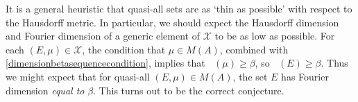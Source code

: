 \documentclass[12pt,reqno]{article}
\DeclareMathOperator{\fordim}{\dim_{\mathbf{F}}}
\DeclareMathOperator{\TT}{\mathbf{T}}
\newtheorem{lemma}[theorem]{Lemma}
\begin{document}
\begin{comment}

\begin{lemma}
    For quasi-all $(E,\mu) \in \mathcal{X}$, $\text{supp}(\mu) = E$.
\end{lemma}
\begin{proof}
    For each closed set $K \subset \TT^d$ with nonempty interior, let $A(K)$ be the family of all $(E,\mu) \in X$ such that $E \cap K \neq \emptyset$ and $\mu(K) = 0$. The set $A(K)$ is clearly closed in $X$. Moreover, this set is nowhere dense; Fix $(E,\mu) \in A(K)$ and $\varepsilon > 0$. Then we can find a smooth probability density $\psi \in C^\infty(\TT^d)$ supported on $K^\circ \cap E_\varepsilon$. We then define $\mu_\varepsilon = (1 - \varepsilon) \mu + \varepsilon \psi$. Now
    \[ \| \mu - \mu_\varepsilon \|_A \leq \varepsilon \left( \| \mu \|_A + \| \psi \|_A \right) \lesssim \varepsilon. \]
    Moreover, $\mu_\varepsilon$ is supported on $\overline{E_\varepsilon}$, so
    \[ d_X((E,\mu), (\overline{E_\varepsilon}, \mu_\varepsilon)) \lesssim \varepsilon. \]
    If we let $A = \bigcup_{n = 1}^\infty A(K_n)$, where $\{ K_n \}$ is the family of all closed cubes in $\TT^d$ whose corners have rational coordinates, then quasi-all $(E,\mu) \in X$ belong to $A^c$. But $A^c$ is precisely the family of pairs $(E,\mu)$ with $\text{supp}(\mu) = E$.
\end{proof}

\end{comment}

It is a general heuristic that quasi-all sets are as `thin as possible' with respect to the Hausdorff metric. In particular, we should expect the Hausdorff dimension and Fourier dimension of a generic element of $\mathcal{X}$ to be as low as possible. For each $(E,\mu) \in \mathcal{X}$, the condition that $\mu \in M(A)$, combined with \eqref{dimensionbetasequencecondition}, implies that $\fordim(\mu) \geq \beta$, so $\fordim(E) \geq \beta$. Thus we might expect that for quasi-all $(E,\mu) \in M(A)$, the set $E$ has Fourier dimension \emph{equal to} $\beta$. This turns out to be the correct conjecture.
\end{document}
